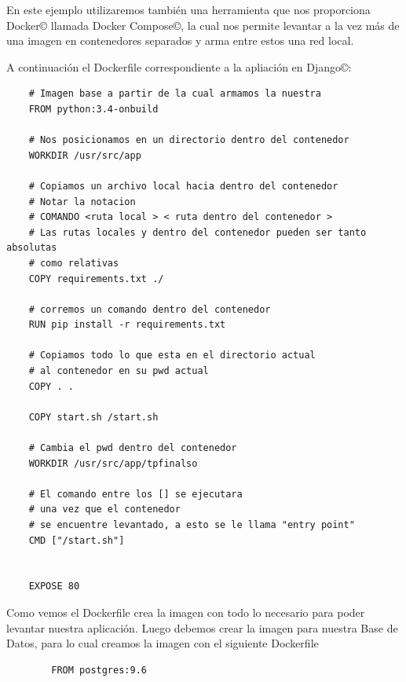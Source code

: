 \documentclass[14pt]{extarticle}
\begin{document}
    En este ejemplo utilizaremos también una herramienta que nos proporciona Docker\copyright{} llamada Docker Compose\copyright{}, la cual nos permite levantar a la vez más de una imagen en contenedores separados y arma entre estos una red local.

    A continuación el Dockerfile correspondiente a la apliación en Django\copyright{}:\\


    \begin{lstlisting}
    # Imagen base a partir de la cual armamos la nuestra
    FROM python:3.4-onbuild
    
    # Nos posicionamos en un directorio dentro del contenedor
    WORKDIR /usr/src/app

    # Copiamos un archivo local hacia dentro del contenedor
    # Notar la notacion 
    # COMANDO <ruta local > < ruta dentro del contenedor >
    # Las rutas locales y dentro del contenedor pueden ser tanto absolutas
    # como relativas
    COPY requirements.txt ./

    # corremos un comando dentro del contenedor
    RUN pip install -r requirements.txt

    # Copiamos todo lo que esta en el directorio actual
    # al contenedor en su pwd actual
    COPY . .

    COPY start.sh /start.sh

    # Cambia el pwd dentro del contenedor
    WORKDIR /usr/src/app/tpfinalso

    # El comando entre los [] se ejecutara 
    # una vez que el contenedor
    # se encuentre levantado, a esto se le llama "entry point"
    CMD ["/start.sh"]


    EXPOSE 80
    \end{lstlisting}

    Como vemos el Dockerfile crea la imagen con todo lo necesario para poder levantar nuestra aplicación.
    Luego debemos crear la imagen para nuestra Base de Datos, para lo cual creamos la imagen con el siguiente Dockerfile

    \begin{lstlisting}
        FROM postgres:9.6
    \end{lstlisting}
\end{document}
